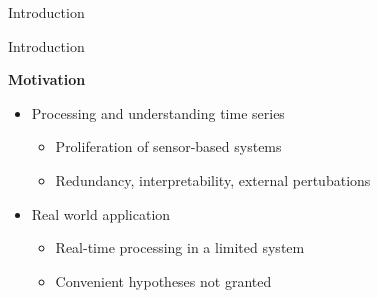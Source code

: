 \documentclass[8pt,t,aspectratio=1610]{beamer}
\begin{document}
\begin{frame}{Introduction}
\begin{minipage}[t]{\linewidth}
\begin{minipage}[t]{0.5\linewidth}
    \end{minipage}
\end{minipage}
\end{frame}

\begin{frame}{Introduction}{}
\begin{minipage}[t]{\linewidth}
    \textbf{Motivation}
    \begin{itemize}
        \item Processing and understanding time series
        \begin{itemize}
            \item Proliferation of sensor-based systems
            \item Redundancy, interpretability, external pertubations
        \end{itemize}
        \item Real world application
        \begin{itemize}
            \item Real-time processing in a limited system
            \item Convenient hypotheses not granted
        \end{itemize}
    \end{itemize}
\end{minipage}


\end{frame}
\end{document}
